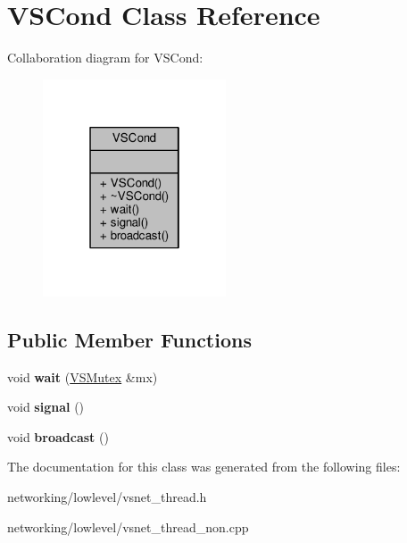 \hypertarget{classVSCond}{}\section{V\+S\+Cond Class Reference}
\label{classVSCond}


Collaboration diagram for V\+S\+Cond\+:
\nopagebreak
\begin{figure}[H]
\begin{center}
\leavevmode
\includegraphics[width=154pt]{de/ded/classVSCond__coll__graph}
\end{center}
\end{figure}
\subsection*{Public Member Functions}
\begin{DoxyCompactItemize}
\item 
void {\bfseries wait} (\hyperlink{classVSMutex}{V\+S\+Mutex} \&mx)\hypertarget{classVSCond_a4c3f5cb27297e10d7c70abf9e90d34b6}{}\label{classVSCond_a4c3f5cb27297e10d7c70abf9e90d34b6}

\item 
void {\bfseries signal} ()\hypertarget{classVSCond_a28c78f0324047614ed539c5199445b97}{}\label{classVSCond_a28c78f0324047614ed539c5199445b97}

\item 
void {\bfseries broadcast} ()\hypertarget{classVSCond_af575dc3d003e402cf3c83ba44aed2950}{}\label{classVSCond_af575dc3d003e402cf3c83ba44aed2950}

\end{DoxyCompactItemize}


The documentation for this class was generated from the following files\+:\begin{DoxyCompactItemize}
\item 
networking/lowlevel/vsnet\+\_\+thread.\+h\item 
networking/lowlevel/vsnet\+\_\+thread\+\_\+non.\+cpp\end{DoxyCompactItemize}

